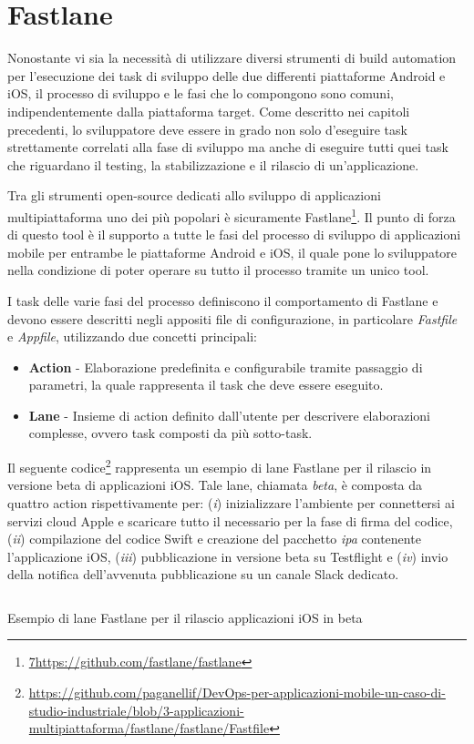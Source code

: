 \section{Fastlane}
\label{fastlane-sec}
Nonostante vi sia la necessità di utilizzare diversi strumenti di build automation per l'esecuzione dei task di sviluppo delle due differenti piattaforme Android e iOS,
il processo di sviluppo e le fasi che lo compongono sono comuni,
indipendentemente dalla piattaforma target. 
Come descritto nei capitoli precedenti, 
lo sviluppatore deve essere in grado non solo d'eseguire task strettamente correlati alla fase di sviluppo ma anche di eseguire tutti quei task che riguardano il testing, 
la stabilizzazione e il rilascio di un'applicazione.

Tra gli strumenti open-source dedicati allo sviluppo di applicazioni multipiattaforma uno dei più popolari è sicuramente Fastlane\footnote{\href{7https://github.com/fastlane/fastlane}{7https://github.com/fastlane/fastlane}}. 
Il punto di forza di questo tool è il supporto a tutte le fasi del processo di sviluppo di applicazioni mobile per entrambe le piattaforme Android e iOS,
il quale pone lo sviluppatore nella condizione di poter operare su tutto il processo tramite un unico tool.

I task delle varie fasi del processo definiscono il comportamento di Fastlane e devono essere descritti negli appositi file di configurazione,
in particolare \textit{Fastfile} e \textit{Appfile},
utilizzando due concetti principali:

\begin{itemize}
    \item \textbf{Action} - Elaborazione predefinita e configurabile tramite passaggio di parametri, la quale rappresenta il task che deve essere eseguito.
    
    \item \textbf{Lane} - Insieme di action definito dall'utente per descrivere elaborazioni complesse, ovvero task composti da più sotto-task.
\end{itemize}

Il seguente codice\footnote{\href{https://github.com/paganellif/DevOps-per-applicazioni-mobile-un-caso-di-studio-industriale/blob/3-applicazioni-multipiattaforma/fastlane/fastlane/Fastfile}{https://github.com/paganellif/DevOps-per-applicazioni-mobile-un-caso-di-studio-industriale/blob/3-applicazioni-multipiattaforma/fastlane/fastlane/Fastfile}} rappresenta un esempio di lane Fastlane per il rilascio in versione beta di applicazioni iOS. 
Tale lane, 
chiamata \textit{beta}, 
è composta da quattro action rispettivamente per: 
(\textit{i}) inizializzare l'ambiente per connettersi ai servizi cloud Apple e scaricare tutto il necessario per la fase di firma del codice, 
(\textit{ii}) compilazione del codice Swift e creazione del pacchetto \textit{ipa} contenente l'applicazione iOS, 
(\textit{iii}) pubblicazione in versione beta su Testflight e 
(\textit{iv}) invio della notifica dell'avvenuta pubblicazione su un canale Slack dedicato.

\begin{listing}[H]
    \inputminted{ruby}{code/4-fastlane}
    \caption{Esempio di lane Fastlane per il rilascio applicazioni iOS in beta}
\end{listing}